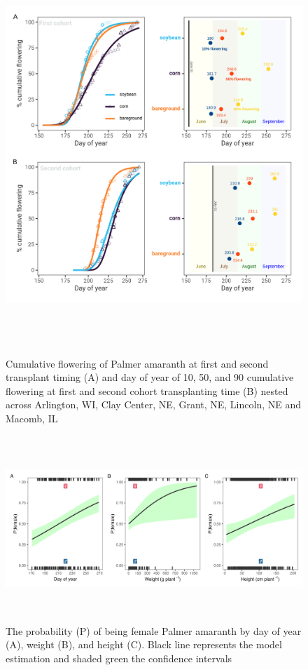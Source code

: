 \documentclass[utf8]{frontiersSCNS}
\begin{document}
\begin{figure}

{\centering \includegraphics[width=150mm,height=150mm]{../data analysis/figures/Figure 4} 

}

\caption{Cumulative flowering of Palmer amaranth at first and second transplant timing (A) and day of year of 10, 50, and 90 cumulative flowering at first and second cohort transplanting time (B) nested across Arlington, WI, Clay Center, NE, Grant, NE, Lincoln, NE and Macomb, IL}\label{fig:Figure-4}
\end{figure}

\begin{figure}

{\centering \includegraphics[width=170mm,height=70mm]{../data analysis/figures/Figure 5} 

}

\caption{The probability (P) of being female Palmer amaranth by day of year (A), weight (B), and height (C). Black line represents the model estimation and shaded green the confidence intervals}\label{fig:Figure-5}
\end{figure}
\end{document}
